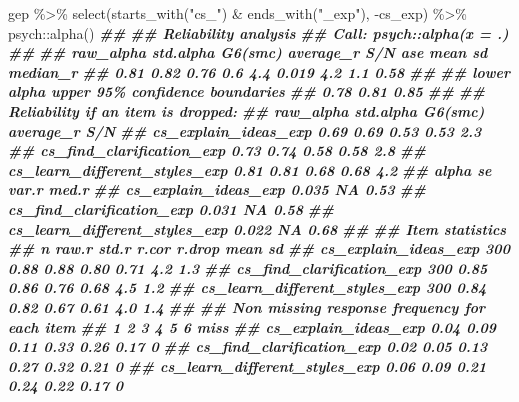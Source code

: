 \documentclass[
]{book}
\newenvironment{Shaded}{\begin{snugshade}}{\end{snugshade}}
\newcommand{\DocumentationTok}[1]{\textcolor[rgb]{0.56,0.35,0.01}{\textbf{\textit{#1}}}}
\newcommand{\FunctionTok}[1]{\textcolor[rgb]{0.00,0.00,0.00}{#1}}
\newcommand{\NormalTok}[1]{#1}
\newcommand{\SpecialCharTok}[1]{\textcolor[rgb]{0.00,0.00,0.00}{#1}}
\newcommand{\StringTok}[1]{\textcolor[rgb]{0.31,0.60,0.02}{#1}}
\begin{document}
\begin{Shaded}
\begin{Highlighting}[]
\NormalTok{gep }\SpecialCharTok{\%\textgreater{}\%}
  \FunctionTok{select}\NormalTok{(}\FunctionTok{starts\_with}\NormalTok{(}\StringTok{"cs\_"}\NormalTok{) }\SpecialCharTok{\&} \FunctionTok{ends\_with}\NormalTok{(}\StringTok{"\_exp"}\NormalTok{), }\SpecialCharTok{{-}}\NormalTok{cs\_exp) }\SpecialCharTok{\%\textgreater{}\%}
\NormalTok{  psych}\SpecialCharTok{::}\FunctionTok{alpha}\NormalTok{()}
\DocumentationTok{\#\# }
\DocumentationTok{\#\# Reliability analysis   }
\DocumentationTok{\#\# Call: psych::alpha(x = .)}
\DocumentationTok{\#\# }
\DocumentationTok{\#\#   raw\_alpha std.alpha G6(smc) average\_r S/N   ase mean  sd median\_r}
\DocumentationTok{\#\#       0.81      0.82    0.76       0.6 4.4 0.019  4.2 1.1     0.58}
\DocumentationTok{\#\# }
\DocumentationTok{\#\#  lower alpha upper     95\% confidence boundaries}
\DocumentationTok{\#\# 0.78 0.81 0.85 }
\DocumentationTok{\#\# }
\DocumentationTok{\#\#  Reliability if an item is dropped:}
\DocumentationTok{\#\#                               raw\_alpha std.alpha G6(smc) average\_r S/N}
\DocumentationTok{\#\# cs\_explain\_ideas\_exp               0.69      0.69    0.53      0.53 2.3}
\DocumentationTok{\#\# cs\_find\_clarification\_exp          0.73      0.74    0.58      0.58 2.8}
\DocumentationTok{\#\# cs\_learn\_different\_styles\_exp      0.81      0.81    0.68      0.68 4.2}
\DocumentationTok{\#\#                               alpha se var.r med.r}
\DocumentationTok{\#\# cs\_explain\_ideas\_exp             0.035    NA  0.53}
\DocumentationTok{\#\# cs\_find\_clarification\_exp        0.031    NA  0.58}
\DocumentationTok{\#\# cs\_learn\_different\_styles\_exp    0.022    NA  0.68}
\DocumentationTok{\#\# }
\DocumentationTok{\#\#  Item statistics }
\DocumentationTok{\#\#                                 n raw.r std.r r.cor r.drop mean  sd}
\DocumentationTok{\#\# cs\_explain\_ideas\_exp          300  0.88  0.88  0.80   0.71  4.2 1.3}
\DocumentationTok{\#\# cs\_find\_clarification\_exp     300  0.85  0.86  0.76   0.68  4.5 1.2}
\DocumentationTok{\#\# cs\_learn\_different\_styles\_exp 300  0.84  0.82  0.67   0.61  4.0 1.4}
\DocumentationTok{\#\# }
\DocumentationTok{\#\# Non missing response frequency for each item}
\DocumentationTok{\#\#                                  1    2    3    4    5    6 miss}
\DocumentationTok{\#\# cs\_explain\_ideas\_exp          0.04 0.09 0.11 0.33 0.26 0.17    0}
\DocumentationTok{\#\# cs\_find\_clarification\_exp     0.02 0.05 0.13 0.27 0.32 0.21    0}
\DocumentationTok{\#\# cs\_learn\_different\_styles\_exp 0.06 0.09 0.21 0.24 0.22 0.17    0}
\end{Highlighting}
\end{Shaded}
\end{document}
